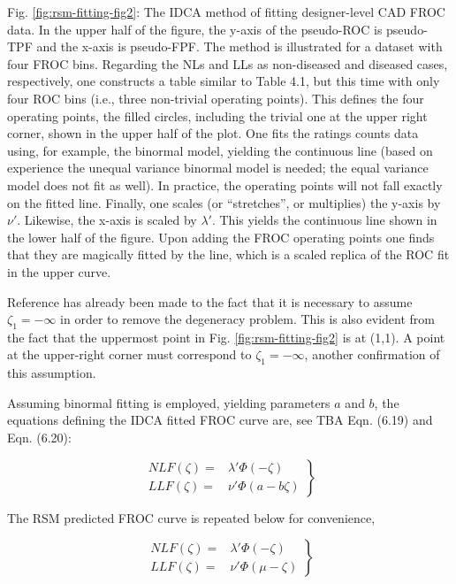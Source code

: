 \documentclass[
]{book}
\begin{document}
Fig. \ref{fig:rsm-fitting-fig2}: The IDCA method of fitting designer-level CAD FROC data. In the upper half of the figure, the y-axis of the pseudo-ROC is pseudo-TPF and the x-axis is pseudo-FPF. The method is illustrated for a dataset with four FROC bins. Regarding the NLs and LLs as non-diseased and diseased cases, respectively, one constructs a table similar to Table 4.1, but this time with only four ROC bins (i.e., three non-trivial operating points). This defines the four operating points, the filled circles, including the trivial one at the upper right corner, shown in the upper half of the plot. One fits the ratings counts data using, for example, the binormal model, yielding the continuous line (based on experience the unequal variance binormal model is needed; the equal variance model does not fit as well). In practice, the operating points will not fall exactly on the fitted line. Finally, one scales (or ``stretches'', or multiplies) the y-axis by \(\nu'\). Likewise, the x-axis is scaled by \(\lambda'\). This yields the continuous line shown in the lower half of the figure. Upon adding the FROC operating points one finds that they are magically fitted by the line, which is a scaled replica of the ROC fit in the upper curve.

Reference has already been made to the fact that it is necessary to assume \(\zeta_1 = -\infty\) in order to remove the degeneracy problem. This is also evident from the fact that the uppermost point in Fig. \ref{fig:rsm-fitting-fig2} is at (1,1). A point at the upper-right corner must correspond to \(\zeta_1 = -\infty\), another confirmation of this assumption.

Assuming binormal fitting is employed, yielding parameters \(a\) and \(b\), the equations defining the IDCA fitted FROC curve are, see TBA Eqn. (6.19) and Eqn. (6.20):

\begin{equation}
\left. 
\begin{aligned}
NLF(\zeta) = & \lambda' \Phi\left ( -\zeta \right ) \\
LLF(\zeta) = & \nu' \Phi\left (a -b\zeta \right ) 
\end{aligned}
\right \}
\label{eq:rsm-fitting-idca-froc-nlf-llf}
\end{equation}

The RSM predicted FROC curve is repeated below for convenience,

\begin{equation}
\left. 
\begin{aligned}
NLF(\zeta) = & \lambda' \Phi\left ( -\zeta \right ) \\
LLF(\zeta) = & \nu' \Phi\left (\mu -\zeta \right ) 
\end{aligned}
\right \}
\label{eq:rsm-fitting-idca-froc-nlf-llf-rsm}
\end{equation}
\end{document}
